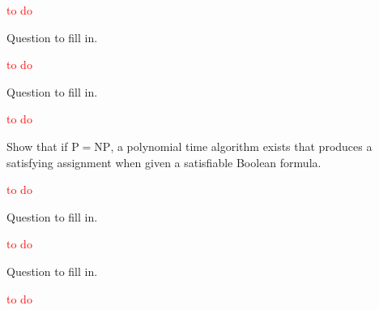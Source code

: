 \textcolor{red}{to do}

\setcounter{exercise}{35}

\begin{exercise}{7.36}
  Question to fill in.
\end{exercise}

\textcolor{red}{to do}

\begin{exercise}{7.37}
  Question to fill in.
\end{exercise}

\textcolor{red}{to do}

\begin{exercise}{7.38}
  Show that if $\mathrm{P}=\mathrm{NP}$, a polynomial time algorithm exists that produces a satisfying assignment when given a satisfiable Boolean formula.
\end{exercise}

\textcolor{red}{to do}

\begin{exercise}{7.39}
  Question to fill in.
\end{exercise}

\textcolor{red}{to do}

\setcounter{exercise}{50}

\begin{exercise}{7.51}
  Question to fill in.
\end{exercise}

\textcolor{red}{to do}
